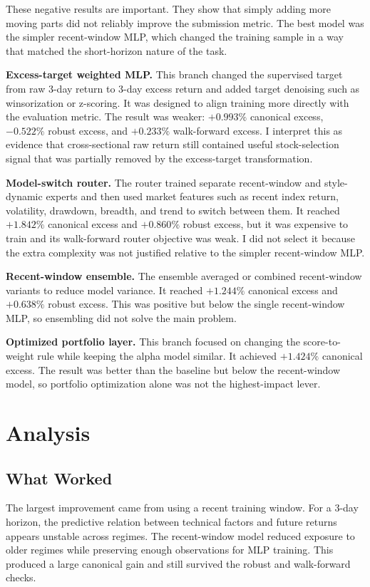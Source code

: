 \documentclass[11pt]{article}
\begin{document}
These negative results are important. They show that simply adding more moving
parts did not reliably improve the submission metric. The best model was the
simpler recent-window MLP, which changed the training sample in a way that
matched the short-horizon nature of the task.

\textbf{Excess-target weighted MLP.}
This branch changed the supervised target from raw 3-day return to 3-day excess
return and added target denoising such as winsorization or z-scoring. It was
designed to align training more directly with the evaluation metric. The result
was weaker: \(+0.993\%\) canonical excess, \(-0.522\%\) robust excess, and
\(+0.233\%\) walk-forward excess. I interpret this as evidence that
cross-sectional raw return still contained useful stock-selection signal that
was partially removed by the excess-target transformation.

\textbf{Model-switch router.}
The router trained separate recent-window and style-dynamic experts and then
used market features such as recent index return, volatility, drawdown, breadth,
and trend to switch between them. It reached \(+1.842\%\) canonical excess and
\(+0.860\%\) robust excess, but it was expensive to train and its walk-forward
router objective was weak. I did not select it because the extra complexity was
not justified relative to the simpler recent-window MLP.

\textbf{Recent-window ensemble.}
The ensemble averaged or combined recent-window variants to reduce model
variance. It reached \(+1.244\%\) canonical excess and \(+0.638\%\) robust
excess. This was positive but below the single recent-window MLP, so ensembling
did not solve the main problem.

\textbf{Optimized portfolio layer.}
This branch focused on changing the score-to-weight rule while keeping the
alpha model similar. It achieved \(+1.424\%\) canonical excess. The result was
better than the baseline but below the recent-window model, so portfolio
optimization alone was not the highest-impact lever.

\section{Analysis}

\subsection{What Worked}

The largest improvement came from using a recent training window. For a 3-day
horizon, the predictive relation between technical factors and future returns
appears unstable across regimes. The recent-window model reduced exposure to
older regimes while preserving enough observations for MLP training. This
produced a large canonical gain and still survived the robust and walk-forward
checks.
\end{document}
